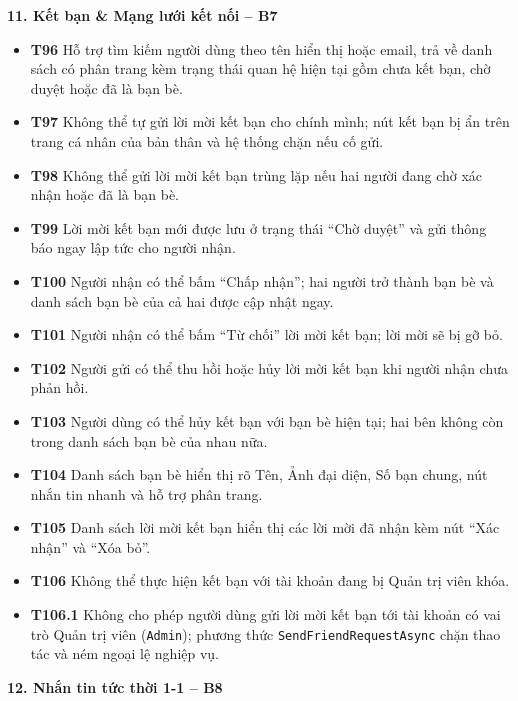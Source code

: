 \documentclass[11pt,a4paper]{article}
\begin{document}
\smallskip
\noindent\textbf{11. Kết bạn \& Mạng lưới kết nối -- B7}
\begin{itemize}[leftmargin=0.9cm, label=$\bullet$, itemsep=2pt, topsep=4pt]
    \item \textbf{T96} Hỗ trợ tìm kiếm người dùng theo tên hiển thị hoặc email, trả về danh sách có phân trang kèm trạng thái quan hệ hiện tại gồm chưa kết bạn, chờ duyệt hoặc đã là bạn bè.
    \item \textbf{T97} Không thể tự gửi lời mời kết bạn cho chính mình; nút kết bạn bị ẩn trên trang cá nhân của bản thân và hệ thống chặn nếu cố gửi.
    \item \textbf{T98} Không thể gửi lời mời kết bạn trùng lặp nếu hai người đang chờ xác nhận hoặc đã là bạn bè.
    \item \textbf{T99} Lời mời kết bạn mới được lưu ở trạng thái ``Chờ duyệt'' và gửi thông báo ngay lập tức cho người nhận.
    \item \textbf{T100} Người nhận có thể bấm ``Chấp nhận''; hai người trở thành bạn bè và danh sách bạn bè của cả hai được cập nhật ngay.
    \item \textbf{T101} Người nhận có thể bấm ``Từ chối'' lời mời kết bạn; lời mời sẽ bị gỡ bỏ.
    \item \textbf{T102} Người gửi có thể thu hồi hoặc hủy lời mời kết bạn khi người nhận chưa phản hồi.
    \item \textbf{T103} Người dùng có thể hủy kết bạn với bạn bè hiện tại; hai bên không còn trong danh sách bạn bè của nhau nữa.
    \item \textbf{T104} Danh sách bạn bè hiển thị rõ Tên, Ảnh đại diện, Số bạn chung, nút nhắn tin nhanh và hỗ trợ phân trang.
    \item \textbf{T105} Danh sách lời mời kết bạn hiển thị các lời mời đã nhận kèm nút ``Xác nhận'' và ``Xóa bỏ''.
    \item \textbf{T106} Không thể thực hiện kết bạn với tài khoản đang bị Quản trị viên khóa.
    \item \textbf{T106.1} Không cho phép người dùng gửi lời mời kết bạn tới tài khoản có vai trò Quản trị viên (\texttt{Admin}); phương thức \texttt{SendFriendRequestAsync} chặn thao tác và ném ngoại lệ nghiệp vụ.
\end{itemize}
\smallskip
\noindent\textbf{12. Nhắn tin tức thời 1-1 -- B8}
\end{document}

